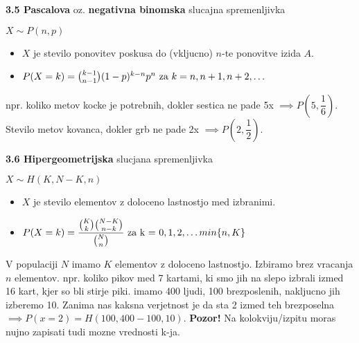 \documentclass{article}
\begin{document}
\begin{multicols}{2}
	\textbf{3.5 Pascalova} oz. \textbf{negativna binomska} slucajna spremenljivka
	\begin{center}
		\begin{math}
			X \sim P(n, p)
		\end{math}
	\end{center}
	\begin{itemize}
		\item $X$ je stevilo ponovitev poskusa do (vkljucno) $n$-te ponovitve izida $A$.
		\item \begin{math}
			      P(X = k) = {k - 1 \choose n - 1 }(1 - p)^{k - n} p^{n} $ za $ k = n, n + 1, n + 2, \dots
		      \end{math}
	\end{itemize}
	npr. koliko metov kocke je potrebnih, dokler sestica ne pade 5x $\implies P(5, \dfrac{1}{6})$. Stevilo metov kovanca,
	dokler grb ne pade 2x $\implies P(2, \dfrac{1}{2})$.

	\textbf{3.6 Hipergeometrijska} slucjana spremenljivka
	\begin{center}
		\begin{math}
			X \sim H(K, N - K, n)
		\end{math}
	\end{center}
	\begin{itemize}
		\item $X$ je stevilo elementov z doloceno lastnostjo med izbranimi.
		\item \begin{math}
			      P(X = k) =  \dfrac{ {K \choose k} {N - K \choose n - k} }{{N \choose n}} $ za k = $ 0,1,2,\dots min\{ n, K \}
		      \end{math}
	\end{itemize}
	V populaciji $N$  imamo $K$ elementov  z doloceno lastnostjo. Izbiramo brez vracanja $n$ elementov.
	npr. koliko pikov med 7 kartami, ki smo jih na slepo izbrali izmed 16 kart, kjer so bli stirje piki.
	imamo 400 ljudi, 100 brezposlenih, nakljucno jih izberemo 10. Zanima nas kaksna verjetnost je da sta
	2 izmed teh brezposelna $\implies P(x=2) = H(100, 400-100, 10)$.
	\textbf{Pozor!} Na kolokviju/izpitu moras nujno zapisati tudi mozne vrednosti k-ja.


\end{multicols}
\end{document}

